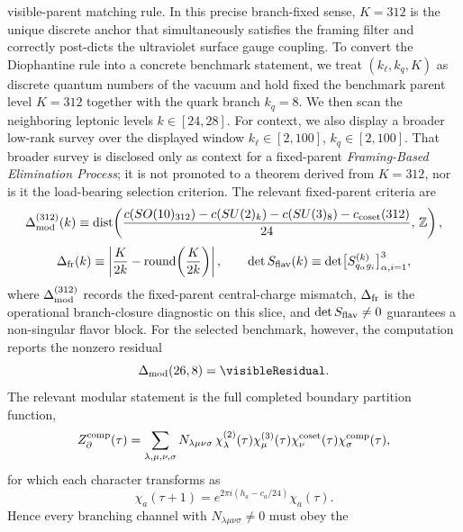 \documentclass[11pt]{article}
\begin{document}
visible-parent matching rule. In this precise branch-fixed sense, $K=312$ is
the unique discrete anchor that simultaneously satisfies the framing filter and
correctly post-dicts the ultraviolet surface gauge coupling.
To convert the Diophantine rule into a concrete benchmark statement, we treat $(k_{\ell},k_q,K)$ as discrete quantum numbers of the vacuum and hold fixed the benchmark parent level $K=312$ together with the quark branch $k_q=8$. We then scan the neighboring leptonic levels $k\in[24,28]$. For context, we also display a broader low-rank survey over the displayed window $k_{\ell}\in[2,100]$, $k_q\in[2,100]$. That broader survey is disclosed only as context for a fixed-parent \emph{Framing-Based Elimination Process}; it is not promoted to a theorem derived from $K=312$, nor is it the load-bearing selection criterion. The relevant fixed-parent criteria are
\begin{equation}
 \Delta_{\rm mod}^{(312)}(k)
 \equiv
 \mathrm{dist}\!\left(
 \frac{c(SO(10)_{312})-c(SU(2)_k)-c(SU(3)_8)-c_{\rm coset}(312)}{24},\,\mathbb Z
 \right),
\end{equation}
\begin{equation}
 \Delta_{\rm fr}(k)
 \equiv
 \left| \frac{K}{2k} - \text{round}\!\left(\frac{K}{2k}\right) \right|,
 \qquad
 \det S_{\rm flav}(k)
 \equiv
 \det\bigl[S^{(k)}_{q_{\alpha}g_i}\bigr]_{\alpha,i=1}^{3},
\end{equation}
where $\Delta_{\rm mod}^{(312)}$ records the fixed-parent central-charge mismatch,
$\Delta_{\rm fr}$ is the operational branch-closure diagnostic on
this slice, and $\det S_{\rm flav}\neq0$ guarantees a non-singular flavor block.
For the selected benchmark, however, the computation reports the nonzero residual
\begin{equation}
 \Delta_{\rm mod}(26,8)=\visibleResidual.
\end{equation}
The relevant modular statement is the full completed boundary partition
function,
\begin{equation}
 Z_{\partial}^{\rm comp}(\tau)
 =
 \sum_{\lambda,\mu,\nu,\sigma}
 N_{\lambda\mu\nu\sigma}\,
 \chi^{(2)}_{\lambda}(\tau)
 \chi^{(3)}_{\mu}(\tau)
 \chi^{\rm coset}_{\nu}(\tau)
 \chi^{\rm comp}_{\sigma}(\tau),
 \label{eq:completed-boundary-partition-function}
\end{equation}
for which each character transforms as
\begin{equation}
 \chi_a(\tau+1)=e^{2\pi i(h_a-c_a/24)}\chi_a(\tau).
\end{equation}
Hence every branching channel with $N_{\lambda\mu\nu\sigma}\neq0$ must obey the
\end{document}
